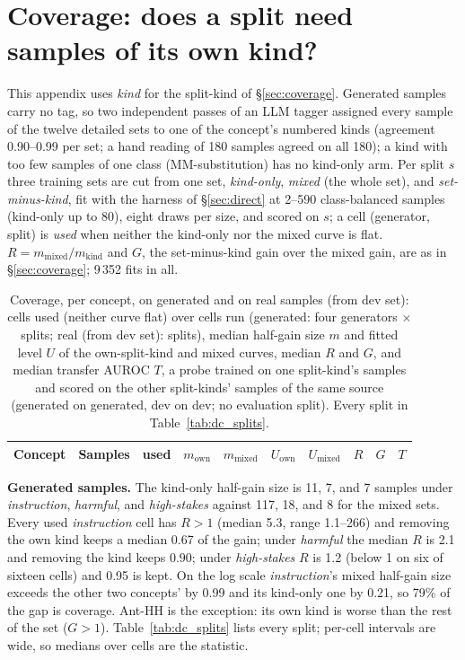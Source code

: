 \documentclass{article} %
\newcommand{\hs}{\emph{high-stakes}}
\newcommand{\harm}{\emph{harmful}}
\newcommand{\instr}{\emph{instruction}}
\begin{document}
\section{Coverage: does a split need samples of its own kind?}
\label{app:coverage}
This appendix uses \emph{kind} for the split-kind of \S\ref{sec:coverage}. Generated samples carry no tag, so two independent passes of an LLM tagger assigned every sample of the twelve detailed sets to one of the concept's numbered kinds (agreement 0.90--0.99 per set; a hand reading of 180 samples agreed on all 180); a kind with too few samples of one class (MM-substitution) has no kind-only arm. Per split $s$ three training sets are cut from one set, \emph{kind-only}, \emph{mixed} (the whole set), and \emph{set-minus-kind}, fit with the harness of \S\ref{sec:direct} at 2--590 class-balanced samples (kind-only up to 80), eight draws per size, and scored on $s$; a cell (generator, split) is \emph{used} when neither the kind-only nor the mixed curve is flat. $R=m_{\text{mixed}}/m_{\text{kind}}$ and $G$, the set-minus-kind gain over the mixed gain, are as in \S\ref{sec:coverage}; 9\,352 fits in all.

\begin{table}[H]
  \caption{Coverage, per concept, on generated and on real samples (from dev set): cells used (neither curve flat) over cells run (generated: four generators $\times$ splits; real (from dev set): splits), median half-gain size $m$ and fitted level $U$ of the own-split-kind and mixed curves, median $R$ and $G$, and median transfer AUROC $T$, a probe trained on one split-kind's samples and scored on the other split-kinds' samples of the same source (generated on generated, dev on dev; no evaluation split). Every split in Table~\ref{tab:dc_splits}.}
  \label{tab:dc_main}
  \centering\small
  \setlength{\tabcolsep}{4pt}
  \begin{tabular}{llcccccccc}
    \toprule
    Concept & Samples & used & $m_{\text{own}}$ & $m_{\text{mixed}}$ & $U_{\text{own}}$ & $U_{\text{mixed}}$ & $R$ & $G$ & $T$ \\
    \midrule
    
  \end{tabular}
\end{table}

\textbf{Generated samples.} The kind-only half-gain size is 11, 7, and 7 samples under \instr{}, \harm{}, and \hs{} against 117, 18, and 8 for the mixed sets. Every used \instr{} cell has $R>1$ (median 5.3, range 1.1--266) and removing the own kind keeps a median 0.67 of the gain; under \harm{} the median $R$ is 2.1 and removing the kind keeps 0.90; under \hs{} $R$ is 1.2 (below 1 on six of sixteen cells) and 0.95 is kept. On the log scale \instr{}'s mixed half-gain size exceeds the other two concepts' by 0.99 and its kind-only one by 0.21, so 79\% of the gap is coverage. Ant-HH is the exception: its own kind is worse than the rest of the set ($G>1$). Table~\ref{tab:dc_splits} lists every split; per-cell intervals are wide, so medians over cells are the statistic.
\end{document}
